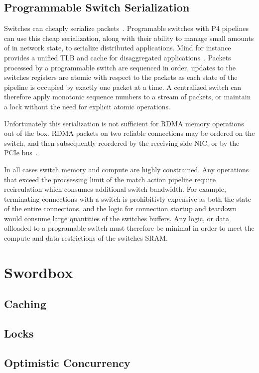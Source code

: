 \subsection{Programmable Switch Serialization}

Switches can cheaply serialize packets~\cite{when-computer}.
Programable switches with P4 pipelines can use this cheap
serialization, along with their ability to manage small
amounts of in network state, to serialize distributed
applications. Mind for instance provides a unified TLB and
cache for disaggregated applications~\cite{mind}. Packets
processed by a programmable switch are sequenced in order,
updates to the switches registers are atomic with respect to
the packets as each state of the pipeline is occupied by
exactly one packet at a time. A centralized switch can
therefore apply monotonic sequence numbers to a stream of
packets, or maintain a lock without the need for explicit
atomic operations.

Unfortunately this serialization is not sufficient for RDMA
memory operations out of the box. RDMA packets on two
reliable connections may be ordered on the switch, and then
subsequently reordered by the receiving side NIC, or by the
PCIe bus~\cite{understanding-pcie}.

In all cases switch memory and compute are highly
constrained. Any operations that exceed the procsessing
limit of the match action pipeline require recirculation
which consumes additional switch bandwidth. For example,
terminating connections with a switch is prohibitivly
expensive as both the state of the entire connections, and
the logic for connection startup and teardown would consume
large quantities of the switches buffers. Any logic, or data
offloaded to a programable switch must therefore be minimal
in order to meet the compute and data restrictions of the
switches SRAM.

\section{Swordbox}

\subsection{Caching}

\subsection{Locks}

\subsection{Optimistic Concurrency}